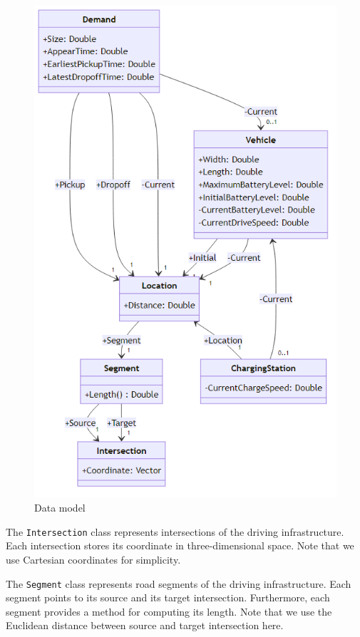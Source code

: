 \documentclass[10pt,twocolumn]{article}
\begin{document}
\begin{figure}[h!]
    \centering
    \includegraphics[scale=0.4]{../../diagrams/model/classes-v0.2.png}
    \caption{Data model}
    \label{fig:data-model}
\end{figure}

The \texttt{Intersection} class represents intersections of the driving infrastructure.
Each intersection stores its coordinate in three-dimensional space.
Note that we use Cartesian coordinates for simplicity.

The \texttt{Segment} class represents road segments of the driving infrastructure.
Each segment points to its source and its target intersection.
Furthermore, each segment provides a method for computing its length.
Note that we use the Euclidean distance between source and target intersection here.
\end{document}
